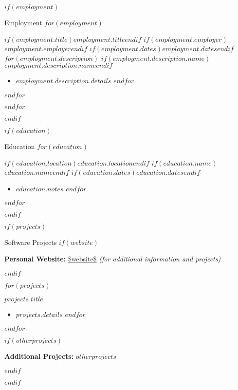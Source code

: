 \documentclass{mcdowellcv}
\begin{document}
  \makeheader

  $if(employment)$
  \begin{cvsection}{Employment}
    $for(employment)$
    \begin{cvsubsection}
      {$if(employment.title)$$employment.title$$endif$}
      {$if(employment.employer)$$employment.employer$$endif$}
      {$if(employment.dates)$$employment.dates$$endif$}
      $for(employment.description)$
      $if(employment.description.name)$$employment.description.name$$endif$
      \begin{itemize}
        $for(employment.description.details)$
        \item $employment.description.details$
        $endfor$
      \end{itemize}
      $endfor$
    \end{cvsubsection}
    $endfor$
  \end{cvsection}
  $endif$
  
  $if(education)$
  \begin{cvsection}{Education}
    $for(education)$
    \begin{cvsubsection}
      {$if(education.location)$$education.location$$endif$}
      {$if(education.name)$$education.name$$endif$}
      {$if(education.dates)$$education.dates$$endif$}
      \begin{itemize}
        $for(education.notes)$
        \item $education.notes$
        $endfor$
      \end{itemize}
    \end{cvsubsection}
    $endfor$
  \end{cvsection}
  $endif$

  $if(projects)$
  \begin{cvsection}{Software Projects}
    $if(website)$
    \begin{cvsubsectiontext}{\textbf{Personal Website:} \url{$website$} \textit{(for additional information and projects)}}
    \end{cvsubsectiontext}
    $endif$
      
    $for(projects)$
    \begin{cvsubsection}{$projects.title$}{}{}
      \begin{itemize}
        $for(projects.details)$
        \item $projects.details$
        $endfor$
      \end{itemize}
    \end{cvsubsection}
    $endfor$

    $if(otherprojects)$
    \begin{cvsubsectiontext}{\textbf{Additional Projects:} $otherprojects$}
    \end{cvsubsectiontext}
    $endif$
  \end{cvsection}
  $endif$
\end{document}
